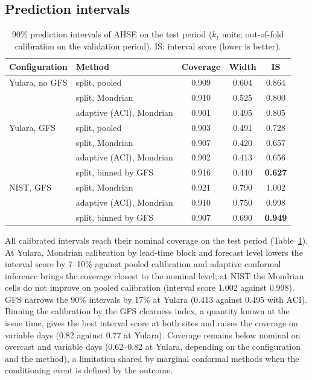 \subsection{Prediction intervals}
\label{subsec:res_intervals}

\begin{table}[t]
  \centering
  \caption{90\% prediction intervals of AHSE on the test period ($k_t$ units; out-of-fold
  calibration on the validation period). IS: interval score (lower is better).}
  \label{tab:intervals}
  \small
  \begin{tabular}{llccc}
    \toprule
    Configuration & Method & Coverage & Width & IS \\
    \midrule
    Yulara, no GFS & split, pooled            & 0.909 & 0.604 & 0.864 \\
                   & split, Mondrian          & 0.910 & 0.525 & 0.800 \\
                   & adaptive (ACI), Mondrian & 0.901 & 0.495 & 0.805 \\
    Yulara, GFS    & split, pooled            & 0.903 & 0.491 & 0.728 \\
                   & split, Mondrian          & 0.907 & 0.420 & 0.657 \\
                   & adaptive (ACI), Mondrian & 0.902 & 0.413 & 0.656 \\
                   & split, binned by GFS     & 0.916 & 0.440 & \textbf{0.627} \\
    NIST, GFS      & split, Mondrian          & 0.921 & 0.790 & 1.002 \\
                   & adaptive (ACI), Mondrian & 0.910 & 0.750 & 0.998 \\
                   & split, binned by GFS     & 0.907 & 0.690 & \textbf{0.949} \\
    \bottomrule
  \end{tabular}
\end{table}

All calibrated intervals reach their nominal coverage on the test period
(Table~\ref{tab:intervals}). At Yulara, Mondrian calibration by lead-time block and forecast
level lowers the interval score by 7--10\% against pooled calibration and adaptive conformal
inference brings the coverage closest to the nominal level; at NIST the Mondrian cells do not
improve on pooled calibration (interval score 1.002 against 0.998). GFS narrows the 90\%
intervals by 17\% at Yulara (0.413 against 0.495 with ACI). Binning the calibration by the GFS
clearness index, a quantity known at the issue time, gives the best interval score at both sites
and raises the coverage on variable days (0.82 against 0.77 at Yulara). Coverage remains below
nominal on overcast and variable days (0.62--0.82 at Yulara, depending on the configuration and
the method), a
limitation shared by marginal conformal methods when the conditioning event is defined by the
outcome.

